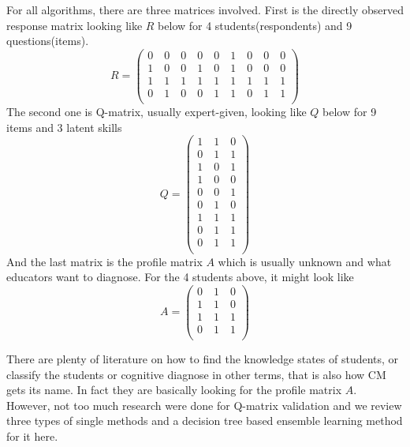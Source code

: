 \documentclass[12pt]{article}
\begin{document}
For all algorithms, there are three matrices involved. First is the directly observed response matrix looking like $R$ below for 4 students(respondents) and 9 questions(items).
$$R=\begin{pmatrix}
0\quad 0\quad 0\quad 0\quad 0\quad 1\quad 0\quad 0\quad 0\\
1\quad 0\quad 0\quad 1\quad 0\quad 1\quad 0\quad 0\quad 0\\
1\quad 1\quad 1\quad 1\quad 1\quad 1\quad 1\quad 1\quad 1\\
0\quad 1\quad 0\quad 0\quad 1\quad 1\quad 0\quad 1\quad 1\\
\end{pmatrix}$$
The second one is Q-matrix, usually expert-given, looking like $Q$ below for 9 items and 3 latent skills
$$Q=\begin{pmatrix}
1\quad 1\quad 0\\
0\quad 1\quad 1\\
1\quad 0\quad 1\\
1\quad 0\quad 0\\
0\quad 0\quad 1\\
0\quad 1\quad 0\\
1\quad 1\quad 1\\
0\quad 1\quad 1\\
0\quad 1\quad 1\\
\end{pmatrix}$$
And the last matrix is the profile matrix $A$ which is usually unknown and what educators want to diagnose. For the 4 students above, it might look like
$$A=\begin{pmatrix}
0\quad 1\quad 0\\
1\quad 1\quad 0\\
1\quad 1\quad 1\\
0\quad 1\quad 1\\
\end{pmatrix}$$

There are plenty of literature on how to find the knowledge states of students, or classify the students or cognitive diagnose in other terms, that is also how CM gets its name. In fact they are basically looking for the profile matrix $A$. However, not too much research were done for Q-matrix validation and we review three types of single methods and a decision tree based ensemble learning method for it here. 
\end{document}
